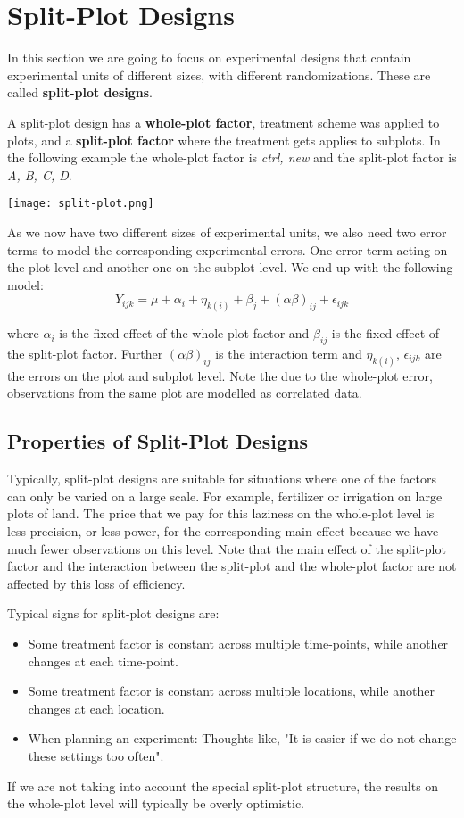 \section{Split-Plot Designs}

In this section we are going to focus on experimental designs that contain experimental units of different sizes, with different randomizations. These are called \textbf{split-plot designs}.

A split-plot design has a \textbf{whole-plot factor}, treatment scheme was applied to plots, and a \textbf{split-plot factor} where the treatment gets applies to subplots. In the following example the whole-plot factor is \textit{ctrl, new} and the split-plot factor is \textit{A, B, C, D}.

\begin{center}
	\texttt{[image: split-plot.png]}
\end{center}

As we now have two different sizes of experimental units, we also need two error terms to model the corresponding experimental errors. One error term acting on the plot level and another one on the subplot level. We end up with the following model:
$$Y_{ijk} = \mu + \alpha_i + \eta_{k(i)} + \beta_j + (\alpha \beta)_{ij} + \epsilon_{ijk}$$

where $\alpha_i$ is the fixed effect of the whole-plot factor and $\beta_{ij}$ is the fixed effect of the split-plot factor. Further $(\alpha \beta)_{ij}$ is the interaction term and $\eta_{k(i)}$, $\epsilon_{ijk}$ are the errors on the plot and subplot level. Note the due to the whole-plot error, observations from the same plot are modelled as correlated data.


\subsection{Properties of Split-Plot Designs}

Typically, split-plot designs are suitable for situations where one of the factors can only be varied on a large scale. For example, fertilizer or irrigation on large plots of land. The price that we pay for this laziness on the whole-plot level is less precision, or less power, for the corresponding main effect because we have much fewer observations on this level. Note that the main effect of the split-plot factor and the interaction between the split-plot and the whole-plot factor are not affected by this loss of efficiency. \medskip

Typical signs for split-plot designs are:
\begin{itemize}
	\item Some treatment factor is constant across multiple time-points, while another changes at each time-point.
	\item Some treatment factor is constant across multiple locations, while another changes at each location.
	\item When planning an experiment: Thoughts like, "It is easier if we do not change these settings too often".
\end{itemize}

If we are not taking into account the special split-plot structure, the results on the whole-plot level will typically be overly optimistic.